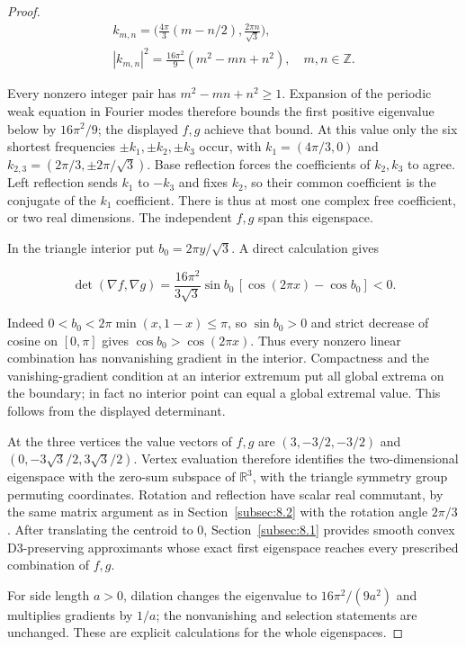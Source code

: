 \documentclass[11pt]{article}
\theoremstyle{definition}
\theoremstyle{remark}
\numberwithin{equation}{section}
\begin{document}
\begin{proof}
\begin{equation}\label{eq:src-8-03}
\begin{gathered}
k_{m,n}=\big(\tfrac{4\pi}{3}(m-n/2),\tfrac{2\pi n}{\sqrt3}\big),\quad \\
|k_{m,n}|^2=\tfrac{16\pi^2}{9}(m^2-mn+n^2),\quad m,n\in\mathbb Z.
\end{gathered}
\end{equation}

Every nonzero integer pair has $m^2-mn+n^2\ge1$. Expansion of the periodic weak equation in Fourier modes therefore bounds the first positive eigenvalue below by $16\pi^2/9$; the displayed $f,g$ achieve that bound. At this value only the six shortest frequencies $\pm k_1,\pm k_2,\pm k_3$ occur, with $k_1=(4\pi/3,0)$ and $k_{2,3}=(2\pi/3,\pm2\pi/\sqrt3)$. Base reflection forces the coefficients of $k_2,k_3$ to agree. Left reflection sends $k_1$ to $-k_3$ and fixes $k_2$, so their common coefficient is the conjugate of the $k_1$ coefficient. There is thus at most one complex free coefficient, or two real dimensions. The independent $f,g$ span this eigenspace.

In the triangle interior put $b_0=2\pi y/\sqrt3$. A direct calculation gives

\begin{equation}\label{eq:src-8-04}
\det(\nabla f,\nabla g)=\frac{16\pi^2}{3\sqrt3}\sin b_0\,[\cos(2\pi x)-\cos b_0]<0.
\end{equation}

Indeed $0<b_0<2\pi\min(x,1-x)\le\pi$, so $\sin b_0>0$ and strict decrease of cosine on $[0,\pi]$ gives $\cos b_0>\cos(2\pi x)$. Thus every nonzero linear combination has nonvanishing gradient in the interior. Compactness and the vanishing-gradient condition at an interior extremum put all global extrema on the boundary; in fact no interior point can equal a global extremal value. This follows from the displayed determinant.

At the three vertices the value vectors of $f,g$ are $(3,-3/2,-3/2)$ and $(0,-3\sqrt3/2,3\sqrt3/2)$. Vertex evaluation therefore identifies the two-dimensional eigenspace with the zero-sum subspace of $\mathbb R^3$, with the triangle symmetry group permuting coordinates. Rotation and reflection have scalar real commutant, by the same matrix argument as in Section~\ref{subsec:8.2} with the rotation angle $2\pi/3$. After translating the centroid to 0, Section~\ref{subsec:8.1} provides smooth convex D3-preserving approximants whose exact first eigenspace reaches every prescribed combination of $f,g$.

For side length $a>0$, dilation changes the eigenvalue to $16\pi^2/(9a^2)$ and multiplies gradients by $1/a$; the nonvanishing and selection statements are unchanged. These are explicit calculations for the whole eigenspaces.
\end{proof}
\end{document}
